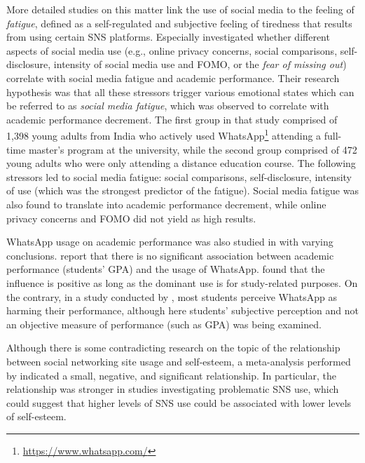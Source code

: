 \documentclass[a4paper,fleqn]{cas-dc}
\begin{document}
More detailed studies on this matter link the use of social media to the feeling of \textit{fatigue}, defined as a self-regulated and subjective feeling of tiredness that results from using certain SNS platforms. Especially \citet{malik2020correlates} investigated whether different aspects of social media use (e.g., online privacy concerns, social comparisons, self-disclosure, intensity of social media use and FOMO, or the \textit{fear of missing out})
 correlate with social media fatigue and academic performance. Their research hypothesis was that all these  stressors  trigger various emotional states which can be referred to as \textit{social media fatigue}, which was observed to  correlate with  academic performance decrement. 
The first group in that study comprised of 1,398 young adults from India who actively used WhatsApp\footnote{\url{https://www.whatsapp.com/}} attending a full-time master's program at the university, while the second group comprised of  472 young adults who were only attending a distance education course. The following stressors led to social media fatigue: social comparisons, self-disclosure, intensity of use (which was the strongest predictor of the fatigue). Social media fatigue was also found to translate into academic performance decrement, while online privacy concerns and FOMO did not yield as high results.

WhatsApp usage on academic performance was also studied in \citep{Alkhalaf2018, Afful2020, yeboah2014impact} with varying conclusions. \citet{Alkhalaf2018} report that there is no significant association between academic performance (students’ GPA) and the usage of WhatsApp. \citet{Afful2020} found that the influence is positive as long as the dominant use is for study-related purposes. On the contrary, in a study conducted by \citet{yeboah2014impact}, most students perceive WhatsApp as harming their performance, although here  students' subjective perception and  not an objective measure of performance (such as  GPA) was being examined.


Although there is some contradicting research on the topic of the relationship between social networking site usage and self-esteem, a meta-analysis performed by \citet{saiphoo2020social} indicated a small, negative, and significant relationship. In particular, the relationship was stronger in studies investigating problematic SNS use, which could suggest that higher levels of SNS use could be associated with lower levels of self-esteem.
\end{document}
